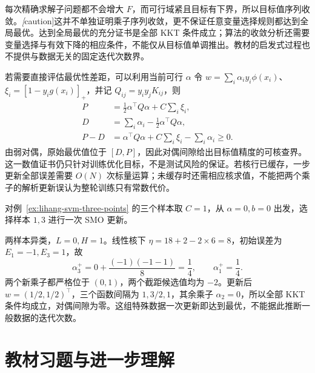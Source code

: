 每次精确求解子问题都不会增大 $F$，而可行域紧且目标有下界，所以目标值序列收敛。\emph[caution]{这并不单独证明乘子序列收敛，更不保证任意变量选择规则都达到全局最优。}达到全局最优的充分证书是全部 KKT 条件成立；算法的收敛分析还需要变量选择与有效下降的相应条件，不能仅从目标值单调推出。教材的启发式过程也不提供与数据无关的固定迭代次数界。

若需要直接评估最优性差距，可以利用当前可行 $\alpha$ 令 $w=\sum_i\alpha_i y_i\phi(x_i)$、$\xi_i=[1-y_i g(x_i)]_+$，并记 $Q_{ij}=y_i y_jK_{ij}$，则
\begin{equation}
  \begin{aligned}
    P&=\frac12\alpha^\top Q\alpha+C\sum_i\xi_i,\\
    D&=\sum_i\alpha_i-\frac12\alpha^\top Q\alpha,\\
    P-D&=\alpha^\top Q\alpha+C\sum_i\xi_i-\sum_i\alpha_i\ge0.
  \end{aligned}
  \label{eq:lihang-svm-duality-gap}
\end{equation}
由弱对偶，原始最优值位于 $[D,P]$，因此对偶间隙给出目标值精度的可核查界。这一数值证书仍只针对训练优化目标，不是测试风险的保证。若核行已缓存，一步更新全部误差需要 $O(N)$ 次标量运算；未缓存时还需相应核求值，不能把两个乘子的解析更新误认为整轮训练只有常数代价。

\begin{example}
\label{ex:lihang-svm-smo-step}
对例~\ref{ex:lihang-svm-three-points} 的三个样本取 $C=1$，从 $\alpha=0,b=0$ 出发，选择样本 $1,3$ 进行一次 SMO 更新。
\end{example}
\begin{solve}
两样本异类，$L=0,H=1$。线性核下 $\eta=18+2-2\times6=8$，初始误差为 $E_1=-1,E_3=1$，故
\[
  \alpha_3^+=0+\frac{(-1)(-1-1)}8=\frac14,
  \qquad \alpha_1^+=\frac14.
\]
两个新乘子都严格位于 $(0,1)$，两个截距候选值均为 $-2$。更新后 $w=(1/2,1/2)^\top$，三个函数间隔为 $1,3/2,1$，其余乘子 $\alpha_2=0$，所以全部 KKT 条件均成立，对偶间隙为零。这组特殊数据一次更新即达到最优，不能据此推断一般数据的迭代次数。
\end{solve}

\section{教材习题与进一步理解}
\label{sec:lihang-svm-exercises}

